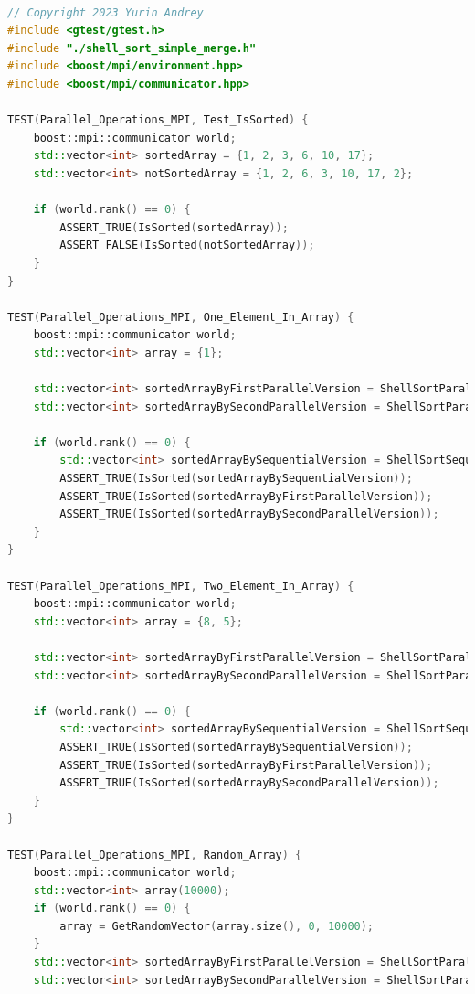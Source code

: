 \documentclass{report}
\begin{document}
\newpage
\begin{lstlisting}[language=C++,caption=main файл]

// Copyright 2023 Yurin Andrey
#include <gtest/gtest.h>
#include "./shell_sort_simple_merge.h"
#include <boost/mpi/environment.hpp>
#include <boost/mpi/communicator.hpp>

TEST(Parallel_Operations_MPI, Test_IsSorted) {
    boost::mpi::communicator world;
    std::vector<int> sortedArray = {1, 2, 3, 6, 10, 17};
    std::vector<int> notSortedArray = {1, 2, 6, 3, 10, 17, 2};

    if (world.rank() == 0) {
        ASSERT_TRUE(IsSorted(sortedArray));
        ASSERT_FALSE(IsSorted(notSortedArray));
    }
}

TEST(Parallel_Operations_MPI, One_Element_In_Array) {
    boost::mpi::communicator world;
    std::vector<int> array = {1};

    std::vector<int> sortedArrayByFirstParallelVersion = ShellSortParallel(array);
    std::vector<int> sortedArrayBySecondParallelVersion = ShellSortParallel(array, true);

    if (world.rank() == 0) {
        std::vector<int> sortedArrayBySequentialVersion = ShellSortSequential(array);
        ASSERT_TRUE(IsSorted(sortedArrayBySequentialVersion));
        ASSERT_TRUE(IsSorted(sortedArrayByFirstParallelVersion));
        ASSERT_TRUE(IsSorted(sortedArrayBySecondParallelVersion));
    }
}

TEST(Parallel_Operations_MPI, Two_Element_In_Array) {
    boost::mpi::communicator world;
    std::vector<int> array = {8, 5};

    std::vector<int> sortedArrayByFirstParallelVersion = ShellSortParallel(array);
    std::vector<int> sortedArrayBySecondParallelVersion = ShellSortParallel(array, true);

    if (world.rank() == 0) {
        std::vector<int> sortedArrayBySequentialVersion = ShellSortSequential(array);
        ASSERT_TRUE(IsSorted(sortedArrayBySequentialVersion));
        ASSERT_TRUE(IsSorted(sortedArrayByFirstParallelVersion));
        ASSERT_TRUE(IsSorted(sortedArrayBySecondParallelVersion));
    }
}

TEST(Parallel_Operations_MPI, Random_Array) {
    boost::mpi::communicator world;
    std::vector<int> array(10000);
    if (world.rank() == 0) {
        array = GetRandomVector(array.size(), 0, 10000);
    }
    std::vector<int> sortedArrayByFirstParallelVersion = ShellSortParallel(array);
    std::vector<int> sortedArrayBySecondParallelVersion = ShellSortParallel(array, true);


\end{lstlisting}
\end{document}
